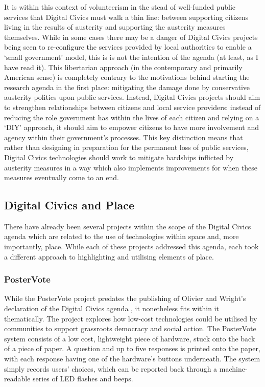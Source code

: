 It is within this context of volunteerism in the stead of well-funded public services that Digital Civics must walk a thin line: between supporting citizens living in the results of austerity and supporting the austerity measures themselves. While in some cases there may be a danger of Digital Civics projects being seen to re-configure the services provided by local authorities to enable a `small government' model, this is is not the intention of the agenda (at least, as I have read it). This libertarian approach (in the contemporary and primarily American sense) is completely contrary to the motivations behind starting the research agenda in the first place: mitigating the damage done by conservative austerity politics upon public services. Instead, Digital Civics projects should aim to strengthen relationships between citizens and local service providers: instead of reducing the role government has within the lives of each citizen and relying on a `DIY' approach, it should aim to empower citizens to have more involvement and agency within their government's processes. This key distinction means that rather than designing in preparation for the permanent loss of public services, Digital Civics technologies should work to mitigate hardships inflicted by austerity measures in a way which also implements improvements for when these measures eventually come to an end. 

\subsection{Digital Civics and Place}

There have already been several projects within the scope of the Digital Civics agenda which are related to the use of technologies within space and, more importantly, place. While each of these projects addressed this agenda, each took a different approach to highlighting and utilising elements of place.

\subsubsection{PosterVote}
While the PosterVote project \citep{Vlachokyriakos2014} predates the publishing of Olivier and Wright's declaration of the Digital Civics agenda \citep{Olivier2015}, it nonetheless fits within it thematically. The project explores how low-cost technologies could be utilised by communities to support grassroots democracy and social action. The PosterVote system consists of a low cost, lightweight piece of hardware, stuck onto the back of a piece of paper. A question and up to five responses is printed onto the paper, with each response having one of the hardware's buttons underneath. The system simply records users' choices, which can be reported back through a machine-readable series of LED flashes and beeps. 

